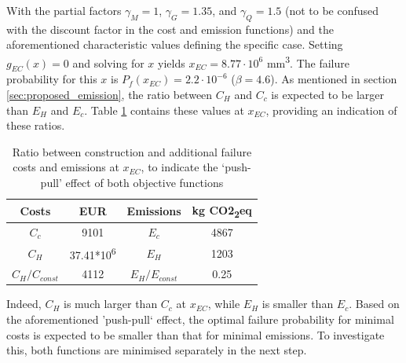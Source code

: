 With the partial factors $\gamma_M=1$, $\gamma_G=1.35$, and $\gamma_Q=1.5$ (not to be confused with the discount factor in the cost and emission functions) and the aforementioned characteristic values defining the specific case.
Setting $g_{EC}(x)=0$ and solving for $x$ yields $x_{EC}=8.77\cdot10^6$ mm\textsuperscript{3}.
The failure probability for this $x$ is $P_f(x_{EC})=2.2\cdot10^{-6}$ ($\beta=4.6$).
As mentioned in section \ref{sec:proposed_emission}, the ratio between $C_H$ and $C_c$ is expected to be larger than $E_H$ and $E_c$.
Table \ref{tab:EC_table} contains these values at $x_{EC}$, providing an indication of these ratios.

\begin{table}[]
    \centering
    \begin{tabular}{c|c||c|c}
        Costs & EUR & Emissions & kg CO2\textsubscript{2}eq \\ \hline
        $C_{c}$ & 9101 & $E_{c}$ & 4867  \\
        $C_{H}$ & 37.41*10\textsuperscript{6} & $E_H$ & 1203 \\
        $C_H / C_{const}$ & 4112 & $E_H/E_{const}$ & 0.25
    \end{tabular}
    \caption{Ratio between construction and additional failure costs and emissions at $x_{EC}$, to indicate the `push-pull' effect of both objective functions}
    \label{tab:EC_table}
\end{table}

Indeed, $C_H$ is much larger than $C_c$ at $x_{EC}$, while $E_H$ is smaller than $E_c$.
Based on the aforementioned 'push-pull` effect, the optimal failure probability for minimal costs is expected to be smaller than that for minimal emissions.
To investigate this, both functions are minimised separately in the next step.
